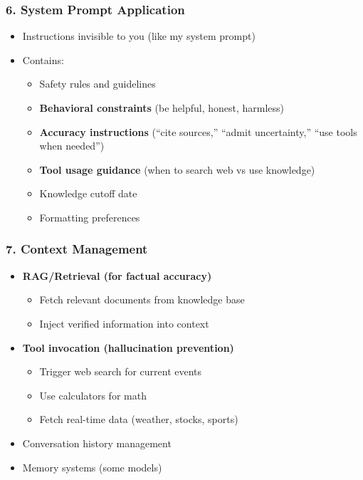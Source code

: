 \subsubsection{6. System Prompt Application }
\begin{itemize}[leftmargin=*]
    \item Instructions invisible to you (like my system prompt)
    \item Contains:
    \begin{itemize}
        \item Safety rules and guidelines
        \item \textbf{Behavioral constraints} (be helpful, honest, harmless)
        \item \textbf{Accuracy instructions} (``cite sources,'' ``admit uncertainty,'' ``use tools when needed'')
        \item \textbf{Tool usage guidance} (when to search web vs use knowledge)
        \item Knowledge cutoff date
        \item Formatting preferences
    \end{itemize}
\end{itemize}

\subsubsection{7. Context Management}
\begin{itemize}[leftmargin=*]
    \item \textbf{RAG/Retrieval {} (for factual accuracy)}
    \begin{itemize}
        \item Fetch relevant documents from knowledge base
        \item Inject verified information into context
    \end{itemize}
    \item \textbf{Tool invocation {} (hallucination prevention)}
    \begin{itemize}
        \item Trigger web search for current events
        \item Use calculators for math
        \item Fetch real-time data (weather, stocks, sports)
    \end{itemize}
    \item Conversation history management
    \item Memory systems (some models)
\end{itemize}


